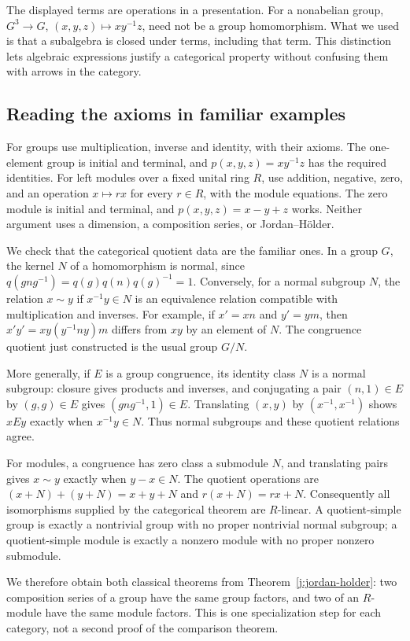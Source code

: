 The displayed terms are operations in a presentation. For a nonabelian group,
$G^3\to G$, $(x,y,z)\mapsto xy^{-1}z$, need not be a group homomorphism.
What we used is that a subalgebra is closed under terms, including that term.
This distinction lets algebraic expressions justify a categorical property
without confusing them with arrows in the category.

\subsection{Reading the axioms in familiar examples}\label{e:examples}

For groups use multiplication, inverse and identity, with their axioms.
The one-element group is initial and terminal, and
$p(x,y,z)=xy^{-1}z$ has the required identities. For left modules over a fixed
unital ring $R$, use addition, negative, zero, and an operation $x\mapsto rx$
for every $r\in R$, with the module equations. The zero module is initial
and terminal, and $p(x,y,z)=x-y+z$ works. Neither argument uses a dimension,
a composition series, or Jordan--H\"older.

We check that the categorical quotient data are the familiar ones. In a
group $G$, the kernel $N$ of a homomorphism is normal, since
$q(gng^{-1})=q(g)q(n)q(g)^{-1}=1$. Conversely, for a normal subgroup $N$,
the relation $x\sim y$ if $x^{-1}y\in N$ is an equivalence relation
compatible with multiplication and inverses. For example, if $x'=xn$ and
$y'=ym$, then $x'y'=xy(y^{-1}ny)m$ differs from $xy$ by an element of $N$.
The congruence quotient just constructed is the usual group $G/N$.

More generally, if $E$ is a group congruence, its identity class $N$ is a
normal subgroup: closure gives products and inverses, and conjugating a pair
$(n,1)\in E$ by $(g,g)\in E$ gives $(gng^{-1},1)\in E$. Translating
$(x,y)$ by $(x^{-1},x^{-1})$ shows $xEy$ exactly when $x^{-1}y\in N$.
Thus normal subgroups and these quotient relations agree.

For modules, a congruence has zero class a submodule $N$, and translating
pairs gives $x\sim y$ exactly when $y-x\in N$. The quotient operations are
$(x+N)+(y+N)=x+y+N$ and $r(x+N)=rx+N$. Consequently all isomorphisms supplied
by the categorical theorem are $R$-linear. A quotient-simple group is exactly
a nontrivial group with no proper nontrivial normal subgroup; a quotient-simple
module is exactly a nonzero module with no proper nonzero submodule.

We therefore obtain both classical theorems from Theorem~\ref{j:jordan-holder}:
two composition series of a group have the same group factors, and two of an
$R$-module have the same module factors. This is one specialization step for
each category, not a second proof of the comparison theorem.

